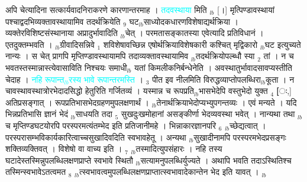 \documentclass[article,12pt,a4paper]{memoir}%
\newcommand{\quotelemma}[1]{\textcolor{cyan}{#1}}
\newcounter{parCount}
\begin{document}
	  
	  \pstart \leavevmode%
	\hphantom{.}अपि चेत्यादिना सत्कार्यवादनिराकरणे कारणान्तरमाह । \quotelemma{तदवस्थाया} मिति {\tiny $_{lb}$} \cite[6a4]{vn-msN} [।] मृत्पिण्डावस्थायां पश्चाद्वदभिव्यक्तावस्थायामिव तदर्थक्रियेति {\tiny $_{9}$} \leavevmode{} घट{\tiny $_{lb}$}साध्योदकधारणविशेषाद्यर्थक्रिया । व्यक्तेरविशिष्टसंस्थानाया अप्रादुर्भावादिति {\tiny $_{lb}$}चेत् । परमतासङ्कातस्या एवेत्यादि प्रतिविधानं । एतदुक्तम्भवति । {\tiny $_{lb}$}ग्रीवादिसन्निवे {\tiny $_{1}$} शविशेषावच्छिन्न एषोर्थक्रियाविशेषकारी कश्चित् मृद्विकारो {\tiny $_{lb}$}घट इत्युच्यते नान्यः । स चेत् प्रागपि मृप्तिण्डावस्थायामपि तदाव्यक्तावस्थायामिव {\tiny $_{lb}$}तदर्थक्रियोपल्ब्धौ स्या {\tiny $_{2}$} तां । न च भवतस्तस्मान्नास्त्येवासाविति निश्चयः समाधी{\tiny $_{lb}$} \leavevmode{} यतां किमलीकनिर्बन्धेनेति । अवस्थातुर्भावादसावप्यस्तीति चेदाह । \quotelemma{नहि रूपान्त{\tiny $_{lb}$}रस्य भावे रूपान्तरमस्ति} \cite[6a5]{vn-msN} । {\tiny $_{3}$} पीत इव नीलमिति विरुद्धव्याप्तोपलब्धिरा{\tiny $_{lb}$}कूता । न चावस्थावस्थात्रोरभेदादसिद्धो हेतुरिति गर्जितव्यं । यस्मान्न च रूपप्रति{\tiny $_{lb}$}भासभेदेपि वस्तुभेदो युक्त {\tiny $_{4}$} [ः,] अतिप्रसङ्गात् । रूपप्रतिभासभेदग्रहणमुपलक्षणार्थं । {\tiny $_{lb}$}तेनार्थक्रियाभेदोप्यभ्युपगन्तव्यः । एवं मन्यते । यदि भिन्नप्रतिभासि ज्ञानं भेदं {\tiny $_{lb}$}साधयति तदा {\tiny $_{5}$} सुखदुःखमोहानां असङ्कीर्णा भेदव्यवस्था भवेत् । नान्यथा तथा {\tiny $_{lb}$}च मृप्तिण्डघटयोरपि परस्परमत्यंतम्भेद इति प्रतिजानीमहे । भिन्नाकारज्ञानपरि {\tiny $_{6}$} {\tiny $_{lb}$}च्छेद्यत्वात् । परस्परासम्भविकार्यकारित्वाच्चसुखादिवदिति स्वभावहेतू । अन्यथा {\tiny $_{lb}$}सुखादीनामपि परस्परमभेदप्रसङ्गः शक्तिव्यक्तिवत् । विशेषो वा वाच्य इति । {\tiny $_{7}$} {\tiny $_{lb}$}तस्मादित्युपसंहारः । नहि तस्य घटादेस्तस्मिन्नुपलब्धिलक्षणप्राप्ते स्वभावे स्थितौ {\tiny $_{lb}$}सत्यामनुपलब्धिर्युज्यते । अथापि भवति तदाऽस्थितिश्च तस्मिन्स्वभावेऽतत्वमत {\tiny $_{8}$} {\tiny $_{lb}$}त्स्वभावत्वमुपलब्धिलक्षणप्राप्तात्स्वभावादेकान्तेन भेद इति यावत् ।
	{}
	\pend%
      {\tiny $_{lb}$}
\end{document}
